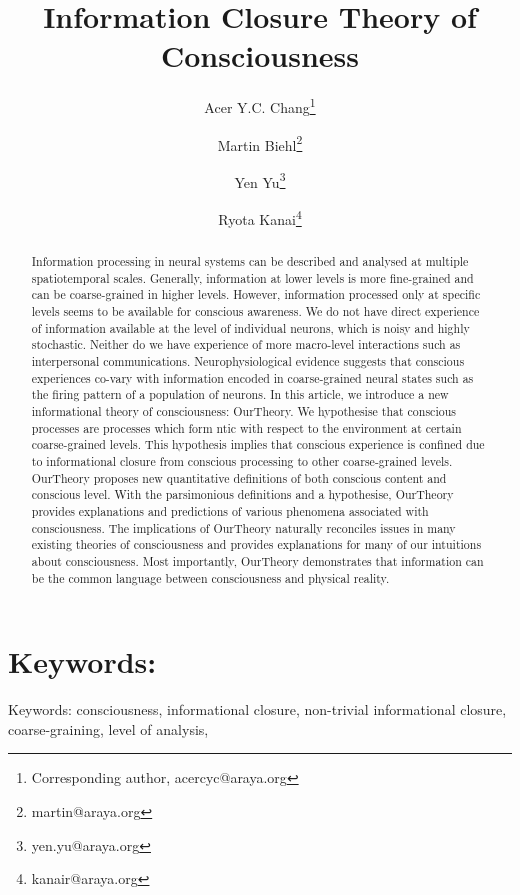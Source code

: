 \documentclass[utf8]{article}
\title{Information Closure Theory of Consciousness}
\date{}
\author[]{Acer Y.C. Chang\thanks{Corresponding author, acercyc@araya.org}}
\author[]{Martin Biehl\thanks{martin@araya.org}}
\author[]{Yen Yu\thanks{yen.yu@araya.org}}
\author[]{Ryota Kanai\thanks{kanair@araya.org }}
\affil[]{ARAYA, Inc., Tokyo, Japan}
\begin{document}
    \linenumbers
	\maketitle
	\tableofcontents


	\begin{abstract}
		Information processing in neural systems can be described and analysed at multiple spatiotemporal scales. Generally, information at lower levels is more fine-grained and can be coarse-grained in higher levels. However, information processed only at specific levels seems to be available for conscious awareness. We do not have direct experience of information available at the level of individual neurons, which is noisy and highly stochastic. Neither do we have experience of more macro-level interactions such as interpersonal communications. Neurophysiological evidence suggests that conscious experiences co-vary with information encoded in coarse-grained neural states such as the firing pattern of a population of neurons. In this article, we introduce a new informational theory of consciousness: \acf{OurTheory}. We hypothesise that conscious processes are processes which form \ac{ntic} with respect to the environment at certain coarse-grained levels. This hypothesis implies that conscious experience is confined due to informational closure from conscious processing to other coarse-grained levels. \ac{OurTheory} proposes new quantitative definitions of both conscious content and conscious level. With the parsimonious definitions and a hypothesise, \ac{OurTheory} provides explanations and predictions of various phenomena associated with consciousness. The implications of \ac{OurTheory} naturally reconciles issues in many existing theories of consciousness and provides explanations for many of our intuitions about consciousness. Most importantly, \ac{OurTheory} demonstrates that information can be the common language between consciousness and physical reality.

		
	\end{abstract}


	\section*{Keywords:}
	Keywords: consciousness, informational closure, non-trivial informational closure, coarse-graining, level of analysis,

            
            
    
\end{document}
